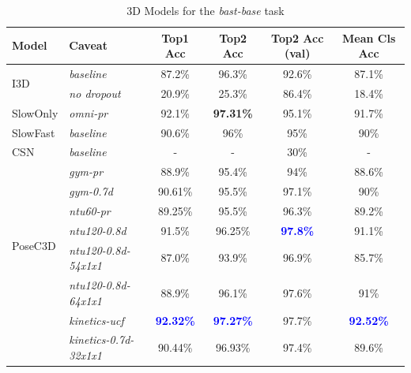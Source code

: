 \documentclass[extern,palatino]{cgMA}
\begin{document}
\begin{table}[h!]
  \begin{center}
    \caption{3D Models for the \textit{bast-base} task}
    \label{tab:research_question_1_3d_models}
    \begin{tabular}{l|l|c|c|c|c}
      \textbf{Model} & \textbf{Caveat} & \textbf{Top1 Acc} & \textbf{Top2 Acc} & \textbf{Top2 Acc (val)} & \textbf{Mean Cls Acc}\\
      \hline
      \multirow{2}{*}{I3D} & \textit{baseline}& 87.2\% & 96.3\% & 92.6\% & 87.1\%\\
      & \textit{no dropout} & 20.9\% & 25.3\% & 86.4\% & 18.4\%\\
      \hline
      \multirow{1}{*}{SlowOnly} & \textit{omni-pr}& 92.1\% & \textbf{97.31\%} & 95.1\% & 91.7\%\\
      \hline
      \multirow{1}{*}{SlowFast} & \textit{baseline}& 90.6\% & 96\% & 95\% & 90\%\\
      \hline
      \multirow{1}{*}{CSN} & \textit{baseline} & - & - & 30\% & -\\
      \hline
      \multirow{7}{*}{PoseC3D} & \textit{gym-pr}& 88.9\% & 95.4\% & 94\% & 88.6\%\\
      & \textit{gym-0.7d}& 90.61\% & 95.5\% & 97.1\% & 90\%\\
      & \textit{ntu60-pr}& 89.25\% & 95.5\% & 96.3\% & 89.2\%\\
      & \textit{ntu120-0.8d}& 91.5\%& 96.25\% & \textcolor{blue}{\textbf{97.8\%}} & 91.1\%\\
      & \textit{ntu120-0.8d-54x1x1}& 87.0\% & 93.9\% & 96.9\% & 85.7\%\\
      & \textit{ntu120-0.8d-64x1x1}& 88.9\% & 96.1\% & 97.6\% & 91\%\\
      & \textit{kinetics-ucf}& \textcolor{blue}{\textbf{92.32\%}} & \textcolor{blue}{\textbf{97.27\%}} & 97.7\% & \textcolor{blue}{\textbf{92.52\%}}\\
      & \textit{kinetics-0.7d-32x1x1}& 90.44\% & 96.93\% & 97.4\% & 89.6\%\\
    \end{tabular}
  \end{center}
\end{table}
\end{document}
